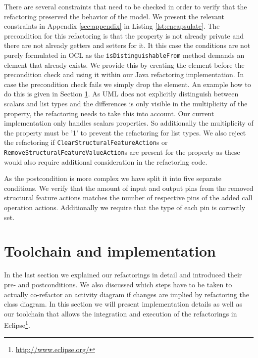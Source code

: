 \documentclass{llncs}
\begin{document}

There are several constraints that need to be checked in order to verify that the refactoring preserved the behavior of the model. 
We present the relevant constraints in Appendix \ref{sec:appendix} in Listing \ref{lst:encapsulate}.
The precondition for this refactoring is that the property is not already private and there are not already getters 
and setters for it. It this case the conditions are not purely formulated in OCL as the \texttt{is\-Distinguishable\-From} method 
demands an element that already exists. We provide this by creating the element before the precondition check and using it 
within our Java refactoring implementation. In case the precondition check fails we simply drop the element. An example how 
to do this is given in Section \ref{sec:toolchain}. 
As UML does not explicitly distinguish between scalars and list types and the differences is only visible
in the multiplicity of the property, the refactoring needs to take this into account. Our current implementation only handles
scalars properties. So additionally the multiplicity of the property must be '1' to prevent the refactoring for list types. We also reject 
the refactoring if \texttt{Clear\-Structural\-Feature\-Action}s or \texttt{Remove\-Structural\-Feature\-Value\-Action}s are present for 
the property as these would also require additional consideration in the refactoring code.

As the postcondition is more complex we have split it into five separate conditions. We verify that the amount of input and output 
pins from the removed structural feature actions matches the number of respective pins of the added call operation actions. Additionally
we require that the type of each pin is correctly set.


\clearpage
\section{Toolchain and implementation}
\label{sec:toolchain}
In the last section we explained our refactorings in detail and introduced their pre- and postconditions. We also discussed which steps 
have to be taken to actually co-refactor an activity diagram if changes are implied by refactoring 
the class diagram. In this section we will present implementation details as well as our toolchain that allows the integration and 
execution of the refactorings in Eclipse\footnote{\url{http://www.eclipse.org/}}.
\end{document}
